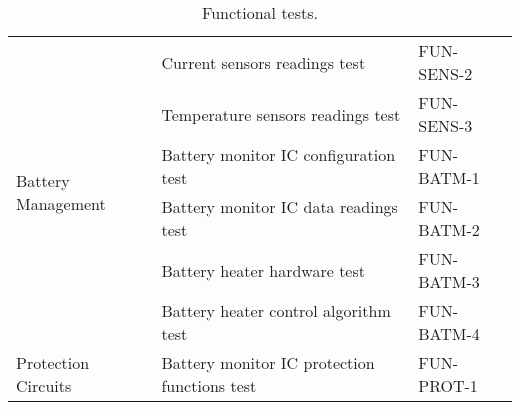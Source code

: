 \begin{table}[htp]
\begin{tabular}{lll}
                                                    & Current sensors readings test                 & FUN-SENS-2     \\
                                                    & Temperature sensors readings test             & FUN-SENS-3     \\
        \midrule
        \multirow{2}{*}{Battery Management}         & Battery monitor IC configuration test         & FUN-BATM-1     \\
                                                    & Battery monitor IC data readings test         & FUN-BATM-2     \\
                                                    & Battery heater hardware test                  & FUN-BATM-3     \\
                                                    & Battery heater control algorithm test         & FUN-BATM-4     \\
        \midrule
        \multirow{1}{*}{Protection Circuits}        & Battery monitor IC protection functions test  & FUN-PROT-1     \\
        \bottomrule
    \end{tabular}
    \caption{Functional tests.}
    \label{tab:functional-tests}
\end{table}


